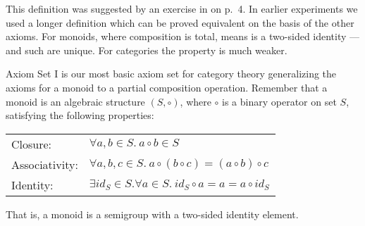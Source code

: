 \begin{isabellebody}
\begin{isamarkuptext}%
This definition was suggested by an exercise in \cite{FreydScedrov90} on p.~4.
In earlier experiments we used a longer definition which can be proved equivalent on the basis
of the other axioms. For monoids, where composition is total,  means  is
a two-sided identity — and such are unique. For categories the property is much weaker.%
\end{isamarkuptext}\isamarkuptrue%
%
\isamarkuptrue%
%
\begin{isamarkuptext}%
Axiom Set I is our most basic axiom set for category theory generalizing the 
axioms for a monoid to a partial composition operation. Remember that a monoid is an 
algebraic structure $(S,\circ)$, where $\circ$ is a binary operator on set $S$, 
satisfying the following properties:

\begin{tabular}{ll}
Closure: & $ \forall a,b \in S.\ a \circ b \in S$ \\
Associativity: & $\forall a,b,c \in S.\ a \circ (b \circ c) = (a \circ b) \circ c$ \\
Identity: & $\exists id_S \in S. \forall a\in S.\ id_S\circ a = a = a \circ id_S$
\end{tabular}

That is, a monoid is a semigroup with a two-sided identity element.


\end{isamarkuptext}
\end{isabellebody}

